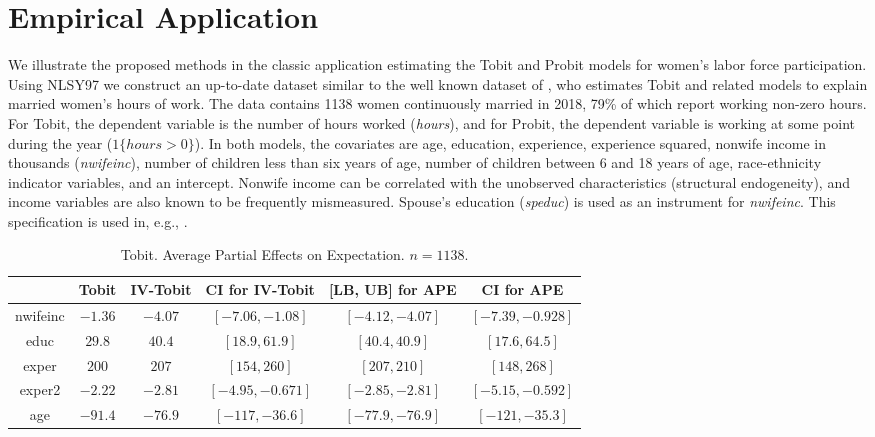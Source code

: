\documentclass[12pt]{article}
\begin{document}
\bigskip

\section{Empirical Application}\label{sec:Empirical}

We illustrate the proposed methods in the classic application estimating the Tobit and Probit
models for women's labor force participation. Using NLSY97 we construct an up-to-date dataset similar to the well known dataset of \cite{Mroz1987Ecta}, who estimates Tobit and related models to explain
married women's hours of work. The data contains 1138 women continuously married in 2018, 79\% of which
report working non-zero hours. For Tobit, the dependent variable is the
number of hours worked (\textit{hours}), and for Probit, the dependent
variable is working at some point during the year ($1\{hours>0\}$). In both
models, the covariates are age, education, experience, experience squared,
nonwife income in thousands (\textit{nwifeinc}), number of children less
than six years of age, number of children between 6 and 18 years of age, race-ethnicity indicator variables, 
and an intercept. Nonwife income can be correlated with the unobserved
characteristics (structural endogeneity), and income variables are also
known to be frequently mismeasured. Spouse's education (\textit{speduc}) is used as an
instrument for \textit{nwifeinc}. This specification is used in, e.g., \cite%
{Wooldridge2010Book}. 

\begin{table}[!h]
  \begin{center}
  \begin{tabular}{|c|c|cc|cc|}
    \hline\hline
   &  Tobit & IV-Tobit & CI for IV-Tobit & [LB, UB] for APE & CI for APE\\ \hline
    nwifeinc &  $-1.36$ & $-4.07$ & $[-7.06,-1.08]$ & $[-4.12,-4.07]$ & $[-7.39,-0.928]$\\ 
    educ &  $29.8$ & $40.4$ & $[18.9,61.9]$ & $[40.4,40.9]$ & $[17.6,64.5]$\\ 
    exper &  $200$ & $207$ & $[154,260]$ & $[207,210]$ & $[148,268]$\\ 
    exper2 &  $-2.22$ & $-2.81$ & $[-4.95,-0.671]$ & $[-2.85,-2.81]$ & $[-5.15,-0.592]$\\ 
    age &  $-91.4$ & $-76.9$ & $[-117,-36.6]$ & $[-77.9,-76.9]$ & $[-121,-35.3]$\\ 
  \hline\hline
  \end{tabular}
  \caption{Tobit. Average Partial Effects on Expectation. $n=1138$.}
  \label{table:Emp-Tobit-PEM-E-w-CI}
  \end{center}
\end{table}
\end{document}
